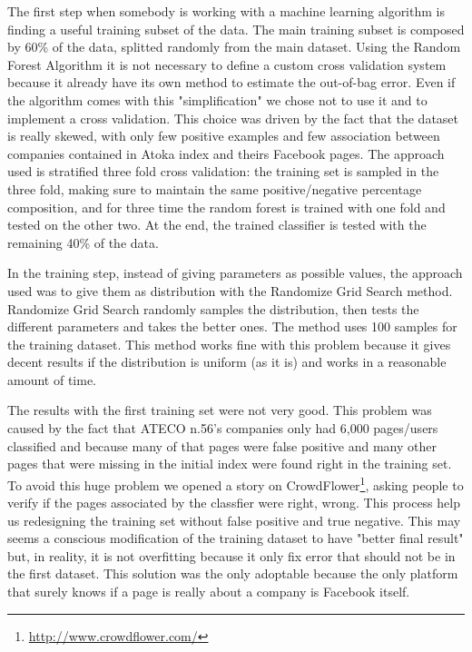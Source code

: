 The first step when somebody is working with a machine learning algorithm is finding a useful training subset of the data. The main training subset is composed by 60\% of the data, splitted randomly from the main dataset.
Using the Random Forest Algorithm it is not necessary to define a custom cross validation system because it already have its own method to estimate the out-of-bag error. Even if the algorithm comes with this "simplification" we chose not to use it and to implement a cross validation. This choice was driven by the fact that the dataset is really skewed, with only few positive examples and few association between companies contained in Atoka index and theirs Facebook pages. The approach used is stratified three fold cross validation: the training set is sampled in the three fold, making sure to maintain the same positive/negative percentage composition, and for three time the random forest is trained with one fold and tested on the other two.
At the end, the trained classifier is tested with the remaining 40\% of the data.

In the training step, instead of giving parameters as possible values, the approach used was to give them as distribution with the Randomize Grid Search method. Randomize Grid Search randomly samples the distribution, then tests the different parameters and takes the better ones. The method uses 100 samples for the training dataset. This method works fine with this problem because it gives decent results if the distribution is uniform (as it is) and works in a reasonable amount of time.

The results with the first training set were not very good. This problem was caused by the fact that ATECO n.56's companies only had 6,000 pages/users classified and because many of that pages were false positive and many other pages that were missing in the initial index were found right in the training set.
To avoid this huge problem we opened a story on CrowdFlower\footnote{\url{http://www.crowdflower.com/}}, asking people to verify if the pages associated by the classfier were right, wrong. This process help us redesigning the training set without false positive and true negative. This may seems a conscious modification of the training dataset to have "better final result" but, in reality, it is not overfitting because it only fix error that should not be in the first dataset. This solution was the only adoptable because the only platform that surely knows if a page is really about a company is Facebook itself.